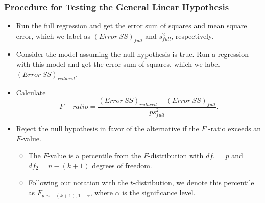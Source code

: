 \begin{frame}%
 \frametitle{Procedure for Testing the General Linear Hypothesis}
\begin{itemize}
\item Run the full regression and get the error sum of squares and mean
square error, which we label as $(Error~SS)_{full}$ and
$s_{full}^{2}$, respectively.

\item Consider the model assuming the null hypothesis is true. Run a
regression with this model and get the error sum of squares, which we label $%
(Error~SS)_{reduced}$.

\item Calculate
\begin{equation*}
F-ratio=\frac{(Error~SS)_{reduced}-(Error~SS)_{full}}{ps_{full}^{2}}.
\end{equation*}
\item Reject the null hypothesis in favor of the alternative if the $F$
-ratio exceeds an $F$-value.
\begin{itemize}
\item The $F$-value is a percentile from the
$F$-distribution with $df_{1}=p$ and $df_{2}=n-(k+1)$ degrees of
freedom.
\item Following our notation with the $t$-distribution, we denote
this percentile as $F_{p,n-(k+1),1-\alpha }$, where $\alpha$ is the
significance level.
  \end{itemize} \end{itemize}
\end{frame}



